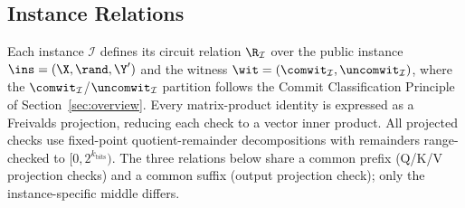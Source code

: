\subsection{Instance Relations}\label{subsec:relations}

Each instance $\mathcal{I}$ defines its circuit relation $\R_\mathcal{I}$ over the public instance $\ins = (\X, \rand, \Y')$ and the witness $\wit = (\comwit_\mathcal{I}, \uncomwit_\mathcal{I})$, where the $\comwit_\mathcal{I}$/$\uncomwit_\mathcal{I}$ partition follows the Commit Classification Principle of Section~\ref{sec:overview}. Every matrix-product identity is expressed as a Freivalds projection, reducing each check to a vector inner product. All projected checks use fixed-point quotient-remainder decompositions with remainders range-checked to $[0, 2^{k_{\mathrm{bits}}})$. The three relations below share a common prefix (Q/K/V projection checks) and a common suffix (output projection check); only the instance-specific middle differs.


